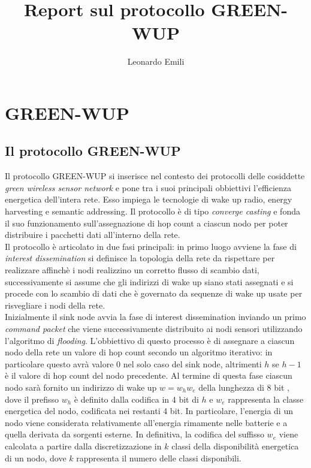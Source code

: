 \documentclass{report}
\title{Report sul protocollo GREEN-WUP}
\author{Leonardo Emili}
\begin{document}
\maketitle
\tableofcontents

\chapter{GREEN-WUP}
\section{Il protocollo GREEN-WUP}

Il protocollo GREEN-WUP si inserisce nel contesto dei protocolli delle cosiddette \emph{green wireless sensor network} e pone tra i suoi principali
obbiettivi l'efficienza energetica dell'intera rete. Esso impiega le tecnologie di wake up radio, energy harvesting e semantic addressing. Il protocollo è
di tipo \emph{converge casting} e fonda il suo funzionamento sull'assegnazione di hop count a ciascun nodo per poter distribuire i pacchetti dati
all'interno della rete.\\

Il protocollo è articolato in due fasi principali: in primo luogo avviene la fase di \emph{interest dissemination} si definisce la
topologia della rete da rispettare per realizzare affinchè i nodi realizzino un corretto flusso di scambio dati, successivamente si assume che gli indirizzi di
wake up siano stati assegnati e si procede con lo scambio di dati che è governato da sequenze di wake up usate per risvegliare i nodi della rete. \\

Inizialmente il sink node avvia la fase di interest dissemination inviando
un primo \emph{command packet} che viene successivamente distribuito ai nodi sensori utilizzando l'algoritmo di \emph{flooding}.
L'obbiettivo di questo processo è di assegnare a ciascun nodo della rete un valore di hop count secondo un algoritmo iterativo: in particolare questo
avrà valore 0 nel solo caso del sink node, altrimenti $h$ se $h-1$ è il valore di hop count del nodo precedente. Al termine
di questa fase ciascun nodo sarà fornito un indirizzo di wake up $w=w_{h}w_{e}$ della lunghezza di 8 bit , dove il prefisso $w_{h}$ è definito dalla
codifica in 4 bit di $h$ e $w_{e}$ rappresenta la classe energetica del nodo, codificata nei restanti 4 bit. In particolare, l'energia di un nodo viene
considerata relativamente all'energia rimamente nelle batterie e a quella derivata da sorgenti esterne. In definitiva, la codifica del suffisso $w_{e}$
viene calcolata a partire dalla discretizzazione in $k$ classi della disponibilità energetica di un nodo, dove $k$ rappresenta il numero delle classi
disponibili.\\
\end{document}
